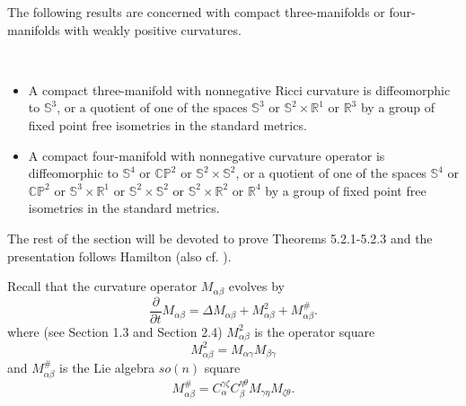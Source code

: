 The following results are concerned with compact three-manifolds
or four-manifolds with weakly positive curvatures.

\begin{theorem}
  \label{thm:cz-nonnegative-curvature-low-dimensional-classification}
 \
\begin{itemize}
\item[(i)] A compact three-manifold with nonnegative Ricci
curvature is diffeomorphic to $\mathbb{S}^3$, or a quotient of one
of the spaces $\mathbb{S}^3$ or $\mathbb{S}^2\times\mathbb{R}^1$
or $\mathbb{R}^3$ by a group of fixed point free isometries in the
standard metrics. \item[(ii)] A compact four-manifold with
nonnegative curvature operator is diffeomorphic to $\mathbb{S}^4$
or $\mathbb{CP}^2$ or $\mathbb{S}^2\times \mathbb{S}^2$, or a
quotient of one of the spaces $\mathbb{S}^4$ or $\mathbb{CP}^2$ or
$\mathbb{S}^3\times\mathbb{R}^1$ or $\mathbb{S}^2\times
\mathbb{S}^2$ or $\mathbb{S}^2\times \mathbb{R}^2$ or
$\mathbb{R}^4$ by a group of fixed point free isometries in the
standard metrics.
\end{itemize}
\end{theorem}

The rest of the section will be devoted to prove Theorems
5.2.1-5.2.3 and the presentation follows Hamilton \cite{Ha82,
Ha86} (also cf. \cite{Ha95F}).

Recall that the curvature operator $M_{\alpha\beta}$ evolves by
\begin{equation} \frac{\partial}{\partial t}M_{\alpha\beta}=\Delta
M_{\alpha\beta}+M^2_{\alpha\beta}+M_{\alpha\beta}^\#.
\end{equation} where (see Section 1.3 and Section 2.4) $M_{\alpha\beta}^2$ is
the operator square
$$
M_{\alpha\beta}^2=M_{\alpha\gamma}M_{\beta\gamma}
$$
and $M_{\alpha\beta}^\#$ is the Lie algebra $so(n)$ square
$$
M_{\alpha\beta}^\#=C_\alpha^{\gamma\zeta}
C_\beta^{\eta\theta}M_{\gamma\eta}M_{\zeta\theta}.
$$

